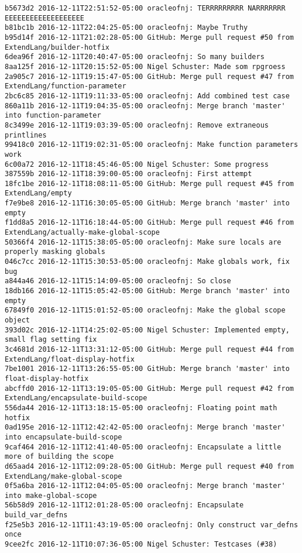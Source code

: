 \begin{lstlisting}
b5673d2 2016-12-11T22:51:52-05:00 oracleofnj: TERRRRRRRRR NARRRRRRR EEEEEEEEEEEEEEEEEEE
b81bc1b 2016-12-11T22:04:25-05:00 oracleofnj: Maybe Truthy
b95d14f 2016-12-11T21:02:28-05:00 GitHub: Merge pull request #50 from ExtendLang/builder-hotfix
6dea96f 2016-12-11T20:40:47-05:00 oracleofnj: So many builders
8aa125f 2016-12-11T20:15:52-05:00 Nigel Schuster: Made som rpgroess
2a905c7 2016-12-11T19:15:47-05:00 GitHub: Merge pull request #47 from ExtendLang/function-parameter
2bc6c85 2016-12-11T19:11:33-05:00 oracleofnj: Add combined test case
860a11b 2016-12-11T19:04:35-05:00 oracleofnj: Merge branch 'master' into function-parameter
8c3499e 2016-12-11T19:03:39-05:00 oracleofnj: Remove extraneous printlines
99418c0 2016-12-11T19:02:31-05:00 oracleofnj: Make function parameters work
6c00a72 2016-12-11T18:45:46-05:00 Nigel Schuster: Some progress
387559b 2016-12-11T18:39:00-05:00 oracleofnj: First attempt
18fc1be 2016-12-11T18:08:11-05:00 GitHub: Merge pull request #45 from ExtendLang/empty
f7e9be8 2016-12-11T16:30:05-05:00 GitHub: Merge branch 'master' into empty
f1dd8a5 2016-12-11T16:18:44-05:00 GitHub: Merge pull request #46 from ExtendLang/actually-make-global-scope
50366f4 2016-12-11T15:38:05-05:00 oracleofnj: Make sure locals are properly masking globals
046c7cc 2016-12-11T15:30:53-05:00 oracleofnj: Make globals work, fix bug
a844a46 2016-12-11T15:14:09-05:00 oracleofnj: So close
18db166 2016-12-11T15:05:42-05:00 GitHub: Merge branch 'master' into empty
67849f0 2016-12-11T15:01:52-05:00 oracleofnj: Make the global scope object
393d02c 2016-12-11T14:25:02-05:00 Nigel Schuster: Implemented empty, small flag setting fix
3c4681d 2016-12-11T13:31:12-05:00 GitHub: Merge pull request #44 from ExtendLang/float-display-hotfix
7be1001 2016-12-11T13:26:55-05:00 GitHub: Merge branch 'master' into float-display-hotfix
abcffd0 2016-12-11T13:19:05-05:00 GitHub: Merge pull request #42 from ExtendLang/encapsulate-build-scope
556da44 2016-12-11T13:18:15-05:00 oracleofnj: Floating point math hotfix
0ad195e 2016-12-11T12:42:42-05:00 oracleofnj: Merge branch 'master' into encapsulate-build-scope
9caf464 2016-12-11T12:41:40-05:00 oracleofnj: Encapsulate a little more of building the scope
d65aad4 2016-12-11T12:09:28-05:00 GitHub: Merge pull request #40 from ExtendLang/make-global-scope
0f5a6ba 2016-12-11T12:04:05-05:00 oracleofnj: Merge branch 'master' into make-global-scope
56b58d9 2016-12-11T12:01:28-05:00 oracleofnj: Encapsulate build_var_defns
f25e5b3 2016-12-11T11:43:19-05:00 oracleofnj: Only construct var_defns once
9cee2fc 2016-12-11T10:07:36-05:00 Nigel Schuster: Testcases (#38)

\end{lstlisting}
